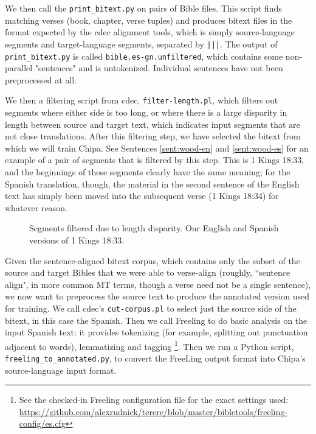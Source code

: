 We then call the \texttt{print\_bitext.py} on pairs of Bible files. This script
finds matching verses (book, chapter, verse tuples) and produces bitext files
in the format expected by the cdec alignment tools, which is simply
source-language segments and target-language segments, separated by
\texttt{|||}. The output of \texttt{print\_bitext.py} is called
\texttt{bible.es-gn.unfiltered}, which contains some non-parallel "sentences"
and is untokenized. Individual sentences have not been preprocessed at all.

We then a filtering script from cdec, \texttt{filter-length.pl}, which filters
out segments where either side is too long, or where there is a large disparity
in length between source and target text, which indicates input segments that
are not close translations. After this filtering step, we have selected the
bitext from which we will train Chipa. See Sentences \ref{sent:wood-en} and
\ref{sent:wood-es} for an example of a pair of segments that is filtered by
this step. This is 1 Kings 18:33, and the beginnings of these segments clearly
have the same meaning; for the Spanish translation, though, the material in the
second sentence of the English text has simply been moved into the subsequent
verse (1 Kings 18:34) for whatever reason.

\begin{figure}
\label{sent:wood-en}
\label{sent:wood-es}
  \caption{Segments filtered due to length disparity. Our English and Spanish
  versions of 1 Kings 18:33.}
  \label{fig:length-disparity}
\end{figure}

Given the sentence-aligned bitext corpus, which contains only the subset of the
source and target Bibles that we were able to verse-align (roughly, ``sentence
align", in more common MT terms, though a verse need not be a single sentence),
we now want to preprocess the source text to produce the annotated version used
for training. We call cdec's \texttt{cut-corpus.pl} to select just the source
side of the bitext, in this case the Spanish. Then we call Freeling to do basic
analysis on the input Spanish text: it provides tokenizing (for example,
splitting out punctuation adjacent to words), lemmatizing and tagging
\footnote{See the checked-in Freeling configuration file for the exact settings
used:
\url{https://github.com/alexrudnick/terere/blob/master/bibletools/freeling-config/es.cfg}}.
Then we run a Python script, \texttt{freeling\_to\_annotated.py}, to convert
the FreeLing output format into Chipa's source-language input format.

